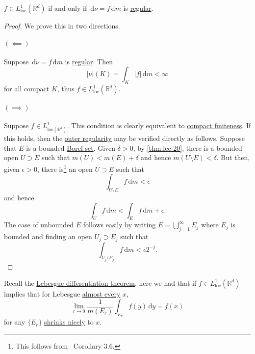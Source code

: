 \begin{lemma}
	\(f \in L^1_{\mathrm{loc}}(\mathbb{R}^d)\) if and only if \(\,\mathrm{d}\nu = f \,\mathrm{d}m\) is \hyperref[def:regular]{regular}.
\end{lemma}
\begin{proof}
	We prove this in two directions.
	\paragraph{\((\impliedby)\)}
	Suppose \(\,\mathrm{d} \nu = f \,\mathrm{d} m\) is \hyperref[def:regular]{regular}. Then
	\[
		\left\vert \nu \right\vert(K) = \int_K \left\vert f \right\vert \,\mathrm{d}m < \infty
	\]
	for all compact \(K\), thus \(f \in L^1_{\mathrm{loc}}(\mathbb{R}^d)\).

	\paragraph{\((\implies)\)}
	Suppose \(f\in L^1_{\mathrm{loc}(\mathbb{R} ^d) }\). This condition is clearly equivalent to
	\hyperref[def:regular-compact-finite]{compact finiteness}. If this holds, then the \hyperref[def:regular-outer-regularity]{outer regularity}
	may be verified directly as follows. Suppose that \(E\) is a bounded \hyperref[def:Borel-set]{Borel set}. Given \(\delta > 0\), by \autoref{thm:lec-20},
	there is a bounded open \(U \supset E\) such that \(m(U) < m(E)+ \delta \) and hence \(m(U\setminus E)< \delta \). But then, given \(\epsilon >0\), there
	is\footnote{This follows from~\cite{folland1999real} Corollary 3.6.} an open \(U \supset E\) such that
	\[
		\int _{U\setminus E}f\,\mathrm{d} m < \epsilon
	\]
	and hence
	\[
		\int _U f\,\mathrm{d} m < \int _E f\,\mathrm{d} m + \epsilon.
	\]
	The case of unbounded \(E\) follows easily by writing \(E = \bigcup_{j=1}^{\infty} E_{j}\)
	where \(E_{j} \) is bounded and finding an open \(U_{j} \supset E_{j} \) such that
	\[
		\int _{U_{j} \setminus E_{j} }f \,\mathrm{d} m < \epsilon 2^{-j}.
	\]
\end{proof}

\begin{prev}
	Recall the \hyperref[thm:Lebesgue-differentiation-theorem]{Lebesgue differentiation theorem}, here we had that if \(f \in L^1_{\mathrm{loc}}(\mathbb{R}^d)\)
	implies that for Lebesgue \hyperref[def:mu-almost-everywhere]{almost every} \(x\),
	\[
		\lim_{r \to 0} \frac{1}{m(E_r)} \int_{E_r} f(y) \,\mathrm{d}y = f(x)
	\]
	for any \(\{E_r\}\) \hyperref[def:shrink-nicely]{shrinks nicely} to \(x\).
\end{prev}

